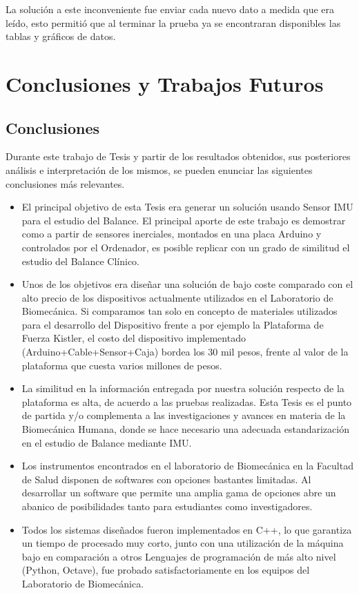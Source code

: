 \documentclass[12pt,a4paper]{article}
\begin{document}
La solución a este inconveniente fue enviar cada nuevo dato a medida que era leído, esto permitió que al terminar la prueba ya se encontraran disponibles las tablas y gráficos de datos.

\section{Conclusiones y Trabajos Futuros}
\subsection{Conclusiones}
Durante este trabajo de Tesis y partir de los resultados obtenidos, sus posteriores análisis e interpretación de los mismos, se pueden enunciar las siguientes conclusiones más relevantes.
\begin{itemize}
	\item El principal objetivo de esta Tesis era generar un solución usando Sensor IMU para el estudio del Balance. El principal aporte de este trabajo es demostrar como a partir de sensores inerciales, montados en una placa Arduino y controlados por el Ordenador, es posible replicar con un grado de similitud el estudio del Balance Clínico.
	
	\item Unos de los objetivos era diseñar una solución de bajo coste comparado con el alto precio de los dispositivos actualmente utilizados en el Laboratorio de Biomecánica. Si comparamos tan solo en concepto de materiales utilizados para el desarrollo del Dispositivo frente a por ejemplo la Plataforma de Fuerza Kistler, el costo del dispositivo implementado (Arduino+Cable+Sensor+Caja) bordea los 30 mil pesos, frente al valor de la plataforma que cuesta varios millones de pesos.
			
	\item La similitud en la información entregada por nuestra solución respecto de la plataforma es alta, de acuerdo a las pruebas realizadas. Esta Tesis es el punto de partida y/o complementa a las investigaciones y avances en materia de la Biomecánica Humana, donde se hace necesario una adecuada estandarización en el estudio de Balance mediante IMU.
	
	\item Los instrumentos encontrados en el laboratorio de Biomecánica en la Facultad de Salud disponen de softwares con opciones bastantes limitadas. Al desarrollar un software que permite una amplia gama de opciones abre un abanico de posibilidades tanto para estudiantes como investigadores.
	
	\item Todos los sistemas diseñados fueron implementados en C++, lo que garantiza un tiempo de procesado muy corto, junto con una utilización de la máquina bajo en comparación a otros Lenguajes de programación de más alto nivel (Python, Octave), fue probado satisfactoriamente en los equipos del Laboratorio de Biomecánica.
\end{itemize} 
\end{document}
